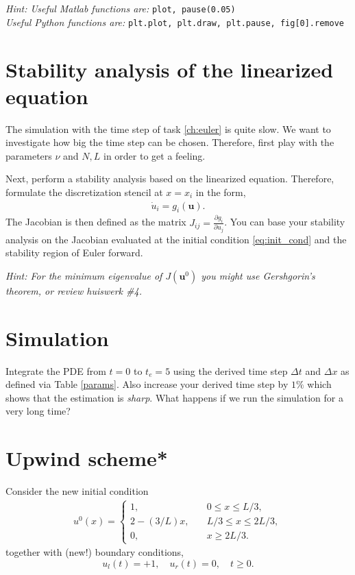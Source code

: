 \documentclass[a4paper,10pt]{article}
\begin{document}
\textit{Hint: Useful Matlab functions are: } \texttt{plot, pause(0.05) }\\
\textit{\phantom{\indent Hint:} Useful Python functions are: } \texttt{plt.plot, plt.draw, plt.pause, fig[0].remove}
\section{Stability analysis of the linearized equation}
\label{eq:timestep}
The simulation with the time step of task \ref{ch:euler} is quite slow. We want to investigate how big the time step can be chosen. Therefore, first play with the parameters $\nu$ and $N,L$ in order to get a feeling.

Next, perform a stability analysis based on the linearized equation. Therefore, formulate the discretization stencil at $x=x_i$ in the form,
\begin{align*}
 \dot{u}_i = g_i(\mathbf{u}).
\end{align*}
The Jacobian is then defined as the matrix $J_{ij} = \frac{\partial g_i}{\partial u_j}$. You can base your stability analysis on the Jacobian evaluated at the initial condition \eqref{eq:init_cond} and the stability region of Euler forward.

\textit{Hint: For the minimum eigenvalue of $J(\mathbf{u}^0)$ you might use Gershgorin's theorem, or review huiswerk \#4.}
\section{Simulation}
Integrate the PDE from $t=0$ to $t_e=5$ using the derived time step $\Delta t$ and $\Delta x$ as defined via Table \ref{params}. Also increase your derived time step by $1\%$ which shows that the estimation is \textit{sharp}. What happens if we run the simulation for a very long time?

\section{Upwind scheme*}
Consider the new initial condition 
\begin{align*}
 u^0(x) = \begin{cases}
           1, &\quad 0 \leq x \leq L/3, \\
           2-(3/L) x, &\quad L/3 \leq x \leq 2L/3,\\
           0, &\quad x \geq 2L/3.
          \end{cases}
\end{align*}
together with (new!) boundary conditions,
\[
 u_l(t) = +1, \quad u_r(t) = 0, \quad t \geq 0.
\]
\end{document}

